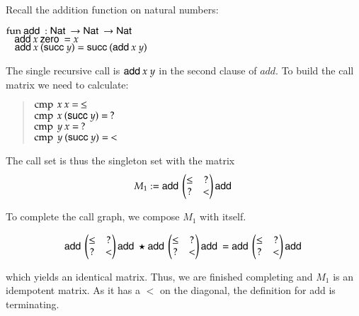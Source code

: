 Recall the addition function on natural numbers:

\begin{bsp}
$\mathrm{fun}\: \mathsf{add}\: : \mathsf{Nat}\: \rightarrow \mathsf{Nat}\: \rightarrow \mathsf{Nat}\:$\\
$\hspace*{3mm} \mathsf{add}\: x \: \mathsf{zero}\: = x $\\
$\hspace*{3mm} \mathsf{add}\: x \: (\mathsf{succ}\: y) = \mathsf{succ}\: (\mathsf{add}\: x \: y)  $
\end{bsp}
The single recursive call is $\mathsf{add}\: x \: y$ in the second clause of $add$.
To build the call matrix we need to calculate:
\begin{quote}
$\operatorname{cmp} \: x \: x = \: \leq $\\
$\operatorname{cmp} \: x \: (\mathsf{succ}\: y) = \: ? $\\
$\operatorname{cmp} \: y \: x = \: ? $\\
$\operatorname{cmp} \: y \: (\mathsf{succ}\: y) = \: < $ 
\end{quote}

\noindent The call set is thus the singleton set with the matrix
\[
M_1 := \mathsf{add}\:\begin{pmatrix}
\leq & ? \\
?    & < \\
\end{pmatrix}\mathsf{add}\:
\]

\noindent To complete the call graph, we compose $M_1$ with itself.

\[
\mathsf{add}\:\begin{pmatrix}
\leq & ? \\
?    & < \\
\end{pmatrix}\mathsf{add}\:
\star
\mathsf{add}\:\begin{pmatrix}
\leq & ? \\
?    & < \\
\end{pmatrix}\mathsf{add}\:
=
\mathsf{add}\:\begin{pmatrix}
\leq & ? \\
?    & < \\
\end{pmatrix}\mathsf{add}\:
\]

\noindent which yields an identical matrix.
Thus, we are finished completing and $M_1$ is an idempotent matrix.
As it has a $<$ on the diagonal, the definition for add is terminating.

